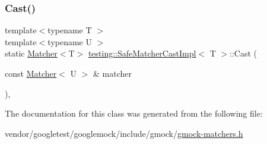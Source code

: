 \mbox{\label{classtesting_1_1_safe_matcher_cast_impl_a034691f9eab929b8b25c33f13937ab95}} 
\subsubsection{\texorpdfstring{Cast()}{Cast()}\hspace{0.1cm}{\footnotesize\ttfamily [2/2]}}
{\footnotesize\ttfamily template$<$typename T $>$ \\
template$<$typename U $>$ \\
static \hyperlink{classtesting_1_1_matcher}{Matcher}$<$T$>$ \hyperlink{classtesting_1_1_safe_matcher_cast_impl}{testing\+::\+Safe\+Matcher\+Cast\+Impl}$<$ T $>$\+::Cast (\begin{DoxyParamCaption}\item[{const \hyperlink{classtesting_1_1_matcher}{Matcher}$<$ U $>$ \&}]{matcher }\end{DoxyParamCaption})\hspace{0.3cm}{\ttfamily [inline]}, {\ttfamily [static]}}



The documentation for this class was generated from the following file\+:\begin{DoxyCompactItemize}
\item 
vendor/googletest/googlemock/include/gmock/\hyperlink{gmock-matchers_8h}{gmock-\/matchers.\+h}\end{DoxyCompactItemize}
